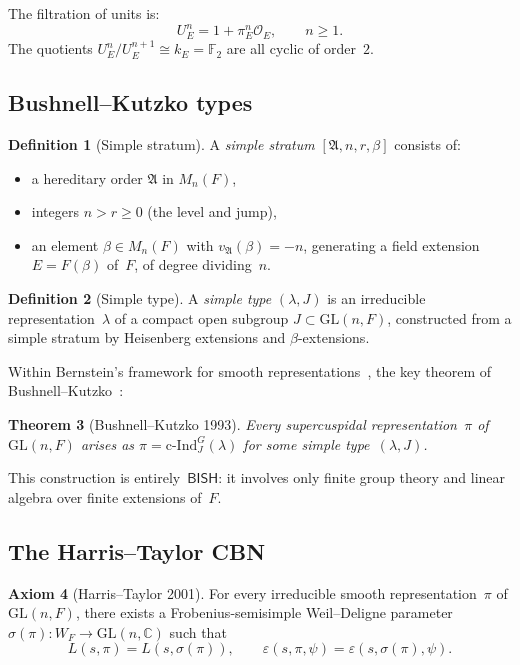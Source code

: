 \documentclass[11pt]{article}
\theoremstyle{plain}
\newtheorem{theorem}{Theorem}[section]
\theoremstyle{definition}
\newtheorem{definition}[theorem]{Definition}
\newtheorem{axiombox}[theorem]{Axiom}
\theoremstyle{remark}
\newcommand{\C}{\mathbb{C}}
\newcommand{\F}{\mathbb{F}}
\newcommand{\calO}{\mathcal{O}}
\newcommand{\fA}{\mathfrak{A}}
\newcommand{\GL}{\mathrm{GL}}
\newcommand{\cInd}{\mathrm{c\text{-}Ind}}
\newcommand{\BISH}{\mathsf{BISH}}
\begin{document}
The filtration of units is:
\[
  U_E^n = 1 + \pi_E^n \calO_E, \qquad n \geq 1.
\]
The quotients $U_E^n / U_E^{n+1} \cong k_E = \F_2$ are all
cyclic of order~$2$.

\subsection{Bushnell--Kutzko types}\label{ssec:bk}

\begin{definition}[Simple stratum]
A \emph{simple stratum} $[\fA, n, r, \beta]$ consists of:
\begin{itemize}[nosep]
\item a hereditary order $\fA$ in $M_n(F)$,
\item integers $n > r \geq 0$ (the level and jump),
\item an element $\beta \in M_n(F)$ with
  $v_\fA(\beta) = -n$, generating a field extension
  $E = F(\beta)$ of~$F$, of degree dividing~$n$.
\end{itemize}
\end{definition}

\begin{definition}[Simple type]
A \emph{simple type} $(\lambda, J)$ is an irreducible
representation~$\lambda$ of a compact open subgroup
$J \subset \GL(n, F)$, constructed from a simple stratum
by Heisenberg extensions and $\beta$-extensions.
\end{definition}

Within Bernstein's framework for smooth
representations~\cite{Bernstein1984}, the key theorem of
Bushnell--Kutzko~\cite{BushnellKutzko1993}:

\begin{theorem}[Bushnell--Kutzko 1993]\label{thm:bk}
Every supercuspidal representation~$\pi$ of~$\GL(n, F)$ arises
as $\pi = \cInd_J^G(\lambda)$ for some simple
type~$(\lambda, J)$.
\end{theorem}

This construction is entirely~$\BISH$: it involves only finite
group theory and linear algebra over finite extensions of~$F$.

\subsection{The Harris--Taylor CBN}\label{ssec:ht}

\begin{axiombox}[Harris--Taylor 2001]\label{ax:ht}
For every irreducible smooth representation~$\pi$ of
$\GL(n, F)$, there exists a Frobenius-semisimple Weil--Deligne
parameter $\sigma(\pi) : W_F \to \GL(n, \C)$ such that
\[
  L(s, \pi) = L(s, \sigma(\pi)), \qquad
  \varepsilon(s, \pi, \psi) = \varepsilon(s, \sigma(\pi), \psi).
\]
\end{axiombox}
\end{document}
